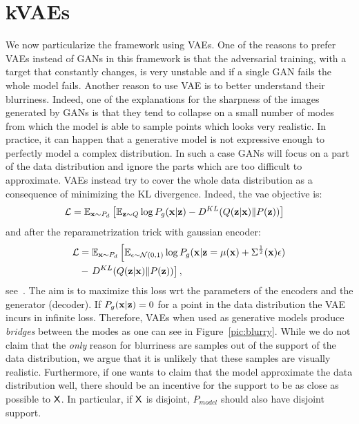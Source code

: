 \documentclass{article}
\newcommand{\Pd}{P_{d}}
\newcommand{\Pm}{P_{model}}
\begin{document}
\section{kVAEs}
We now particularize the framework using VAEs. One of the reasons to prefer VAEs instead of GANs in this framework is that the adversarial training, with a target that constantly changes, is very unstable and if a single GAN fails the whole model fails. Another reason to use VAE is to better understand their blurriness. Indeed, one of the explanations for the sharpness of the images generated by GANs is that they tend to collapse on a small number of modes from which the model is able to sample points which looks very realistic. In practice, it can happen that a generative model is not expressive enough to perfectly model a complex distribution. In such a case GANs will focus on a part of the data distribution and ignore the parts which are too difficult to approximate. VAEs instead try to cover the whole data distribution as a consequence of minimizing the KL divergence.
Indeed, the vae objective is:
\begin{align}
\cL &=
\bbE_{\bx\sim\Pd} \left[\bbE_{\bz\sim Q} \log P_g(\bx|\bz) - D^{KL}(Q(\bz|\bx)\| P(\bz))\right]
\end{align}
and after the reparametrization trick with gaussian encoder: 
\begin{align}
\cL &=\bbE_{\bx\sim\Pd} \left[\bbE_{\epsilon\sim \cN(0,1)} \log P_g(\bx|\bz = \mu(\bx) + \Sigma^{\frac{1}{2}}(\bx)\epsilon)\right.\nonumber \\ 
&- \left. D^{KL}(Q(\bz|\bx)\| P(\bz))\right],
\end{align}
see~\cite{kingma2013auto}.
The aim is to maximize this loss wrt the parameters of the encoders and the generator (decoder). If $P_g({\mathbf{x}}|{\mathbf{z}}) = 0$ for a point in the data distribution the VAE incurs in infinite loss.
Therefore, VAEs when used as generative models produce \textit{bridges} between the modes as one can see in Figure~\ref{pic:blurry}. While we do not claim that the \textit{only} reason for blurriness are samples out of the support of the data distribution, we argue that it is unlikely that these samples are visually realistic. Furthermore, if one wants to claim that the model approximate the data distribution well, there should be an incentive for the support to be as close as possible to $\mathsf{X}$. In particular, if $\mathsf{X}$ is disjoint, $\Pm$ should also have disjoint support.
\end{document}
